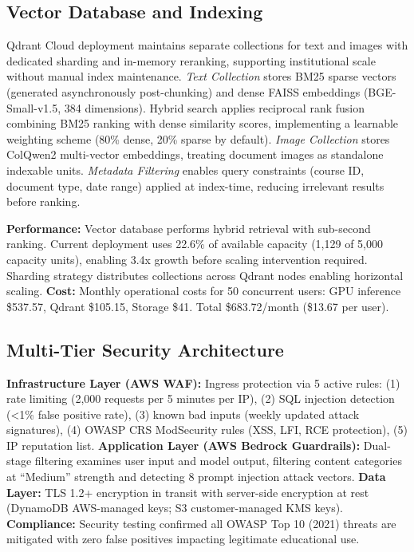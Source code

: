 \documentclass[11pt,a4paper,twocolumn]{article}
\begin{document}
\subsection{Vector Database and Indexing}

Qdrant Cloud deployment maintains separate collections for text and images with dedicated sharding and in-memory reranking, supporting institutional scale without manual index maintenance. \textit{Text Collection} stores BM25 sparse vectors (generated asynchronously post-chunking) and dense FAISS embeddings (BGE-Small-v1.5, 384 dimensions). Hybrid search applies reciprocal rank fusion combining BM25 ranking with dense similarity scores, implementing a learnable weighting scheme (80\% dense, 20\% sparse by default). \textit{Image Collection} stores ColQwen2 multi-vector embeddings, treating document images as standalone indexable units. \textit{Metadata Filtering} enables query constraints (course ID, document type, date range) applied at index-time, reducing irrelevant results before ranking.

\textbf{Performance:} Vector database performs hybrid retrieval with sub-second ranking. Current deployment uses 22.6\% of available capacity (1,129 of 5,000 capacity units), enabling 3.4x growth before scaling intervention required. Sharding strategy distributes collections across Qdrant nodes enabling horizontal scaling. \textbf{Cost:} Monthly operational costs for 50 concurrent users: GPU inference \$537.57, Qdrant \$105.15, Storage \$41. Total \$683.72/month (\$13.67 per user).

\subsection{Multi-Tier Security Architecture}

\textbf{Infrastructure Layer (AWS WAF):} Ingress protection via 5 active rules: (1) rate limiting (2,000 requests per 5 minutes per IP), (2) SQL injection detection (<1\% false positive rate), (3) known bad inputs (weekly updated attack signatures), (4) OWASP CRS ModSecurity rules (XSS, LFI, RCE protection), (5) IP reputation list. \textbf{Application Layer (AWS Bedrock Guardrails):} Dual-stage filtering examines user input and model output, filtering content categories at ``Medium'' strength and detecting 8 prompt injection attack vectors. \textbf{Data Layer:} TLS 1.2+ encryption in transit with server-side encryption at rest (DynamoDB AWS-managed keys; S3 customer-managed KMS keys). \textbf{Compliance:} Security testing confirmed all OWASP Top 10 (2021) threats are mitigated with zero false positives impacting legitimate educational use.
\end{document}
